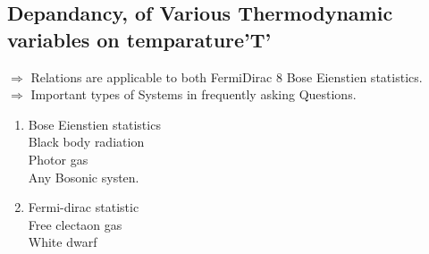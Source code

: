 \subsection	{Depandancy, of Various Thermodynamic variables on temparature'T'}
$\Rightarrow$ Relations are applicable to both FermiDirac 8 Bose Eienstien statistics.\\
$\Rightarrow$ Important types of Systems in frequently asking Questions.\\
\begin{enumerate}
	\item Bose Eienstien statistics\\
	Black body radiation\\
	Photor gas\\
	Any Bosonic systen.\\
	\item Fermi-dirac statistic\\
	Free clectaon gas\\
	White dwarf
\end{enumerate}
